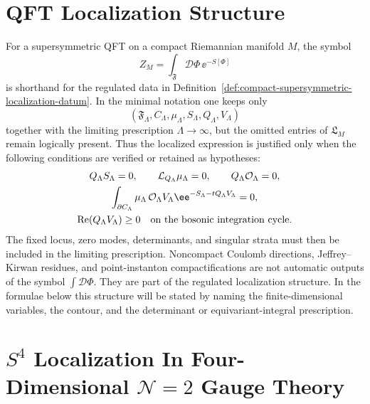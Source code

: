 \section{QFT Localization Structure}

For a supersymmetric QFT on a compact Riemannian manifold \(M\), the symbol
\[
  Z_M=\int_{\mathfrak F}\mathcal D\Phi\,\ee^{-S[\Phi]}
\]
is shorthand for the regulated data in
Definition~\ref{def:compact-supersymmetric-localization-datum}.  In the
minimal notation one keeps only
\[
  (\mathfrak F_\Lambda,C_\Lambda,\mu_\Lambda,S_\Lambda,Q_\Lambda,V_\Lambda)
\]
together with the limiting prescription \(\Lambda\to\infty\), but the omitted
entries of \(\mathfrak L_M\) remain logically present.  Thus the localized
expression is justified only when the following conditions are verified or
retained as hypotheses:
\[
\begin{gathered}
  Q_\Lambda S_\Lambda=0,\qquad
  \mathcal L_{Q_\Lambda}\mu_\Lambda=0,\qquad
  Q_\Lambda\mathcal O_\Lambda=0,\\
  \int_{\partial C_\Lambda}
  \mu_\Lambda\,\mathcal O_\Lambda V_\Lambda
  \ee^{-S_\Lambda-tQ_\Lambda V_\Lambda}=0,\\
  \operatorname{Re}(Q_\Lambda V_\Lambda)\ge0
  \quad\hbox{on the bosonic integration cycle}.
\end{gathered}
\]
The fixed locus, zero modes, determinants, and singular strata must then be
included in the limiting prescription.
Noncompact Coulomb directions, Jeffrey--Kirwan residues, and point-instanton
compactifications are not automatic outputs of the symbol \(\int\mathcal
D\Phi\).  They are part of the regulated localization structure.  In the
formulae below this structure will be stated by naming the finite-dimensional
variables, the contour, and the determinant or equivariant-integral prescription.

\section{\texorpdfstring
  {\(S^4\) Localization In Four-Dimensional \(\mathcal N=2\) Gauge Theory}
  {S4 Localization In Four-Dimensional N=2 Gauge Theory}}

